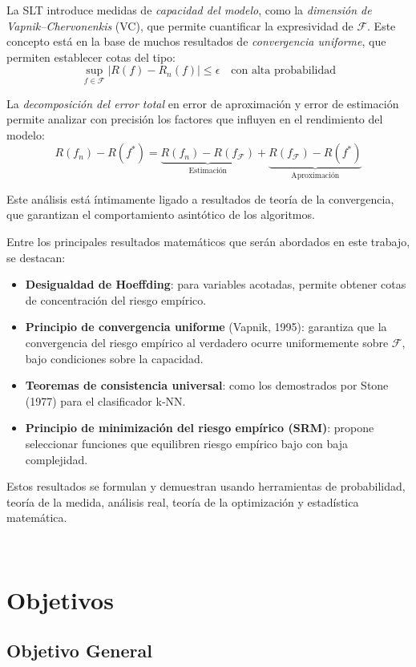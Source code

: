 \documentclass[12pt]{article}
\begin{document}
La SLT introduce medidas de \textit{capacidad del modelo}, como la \textit{dimensión de Vapnik–Chervonenkis} (VC), que permite cuantificar la expresividad de $\mathcal{F}$. Este concepto está en la base de muchos resultados de \textit{convergencia uniforme}, que permiten establecer cotas del tipo:
\[
\sup_{f \in \mathcal{F}} |R(f) - R_n(f)| \leq \epsilon
\quad \text{con alta probabilidad}
\]

La \textit{decomposición del error total} en error de aproximación y error de estimación permite analizar con precisión los factores que influyen en el rendimiento del modelo:
\[
R(f_n) - R(f^*) = 
\underbrace{R(f_n) - R(f_\mathcal{F})}_{\text{Estimación}} + 
\underbrace{R(f_\mathcal{F}) - R(f^*)}_{\text{Aproximación}}
\]

Este análisis está íntimamente ligado a resultados de teoría de la convergencia, que garantizan el comportamiento asintótico de los algoritmos.

Entre los principales resultados matemáticos que serán abordados en este trabajo, se destacan:

\begin{itemize}
    \item \textbf{Desigualdad de Hoeffding}: para variables acotadas, permite obtener cotas de concentración del riesgo empírico.
    \item \textbf{Principio de convergencia uniforme} (Vapnik, 1995): garantiza que la convergencia del riesgo empírico al verdadero ocurre uniformemente sobre $\mathcal{F}$, bajo condiciones sobre la capacidad.
    \item \textbf{Teoremas de consistencia universal}: como los demostrados por Stone (1977) para el clasificador k-NN.
    \item \textbf{Principio de minimización del riesgo empírico (SRM)}: propone seleccionar funciones que equilibren riesgo empírico bajo con baja complejidad.
\end{itemize}

Estos resultados se formulan y demuestran usando herramientas de probabilidad, teoría de la medida, análisis real, teoría de la optimización y estadística matemática. 

\

\section{Objetivos}

\subsection{Objetivo General}
\end{document}
